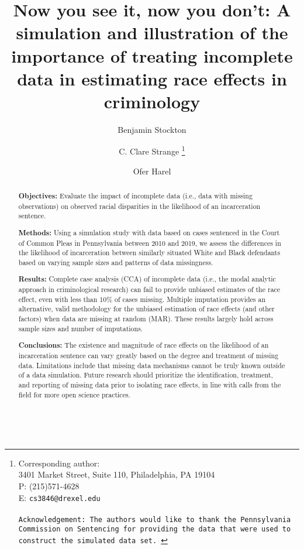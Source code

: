 \documentclass[titlepage]{article}
\title{Now you see it, now you don't: A simulation and illustration of the importance of treating incomplete data in estimating race effects in criminology}
\author[1]{Benjamin Stockton}
\author[2]{C. Clare Strange \thanks{Corresponding author: \\ 3401 Market Street, Suite 110, Philadelphia, PA 19104 \\ P: (215)571-4628 \\ E: \tt{cs3846@drexel.edu} \\ \\ Acknowledgement: The authors would like to thank the Pennsylvania Commission on Sentencing for providing the data that were used to construct the simulated data set. }}
\author[1]{Ofer Harel}
\affil[1]{Department of Statistics, University of Connecticut, Storrs, CT}
\affil[2]{Department of Criminology and Justice Studies, Drexel University, Philadelphia, PA}
\date{} %
\renewcommand{\thefootnote}{\fnsymbol{footnote}}
\begin{document}
\pagestyle{fancy}
\fancyhf{}
\fancyfoot[R]{\thepage}

\maketitle

\renewcommand{\thefootnote}{\arabic{footnote}}

\newpage

\begin{abstract} 
\noindent \textbf{Objectives:} Evaluate the impact of incomplete data (i.e., data with missing observations) on observed racial disparities in the likelihood of an incarceration sentence.

\noindent \textbf{Methods:} Using a simulation study with data based on cases sentenced in the Court of Common Pleas in Pennsylvania between 2010 and 2019, we assess the differences in the likelihood of incarceration between similarly situated White and Black defendants based on varying sample sizes and patterns of data missingness.

\noindent \textbf{Results:} Complete case analysis (CCA) of incomplete data (i.e., the modal analytic approach in criminological research) can fail to provide unbiased estimates of the race effect, even with less than 10\% of cases missing. Multiple imputation provides an alternative, valid methodology for the unbiased estimation of race effects (and other factors) when data are missing at random (MAR). These results largely hold across sample sizes and number of imputations.

\noindent \textbf{Conclusions:} The existence and magnitude of race effects on the likelihood of an incarceration sentence can vary greatly based on the degree and treatment of missing data. Limitations include that missing data mechanisms cannot be truly known outside of a data simulation. Future research should prioritize the identification, treatment, and reporting of missing data prior to isolating race effects, in line with calls from the field for more open science practices.

\noindent{}\\
 \end{abstract}



\end{document}
